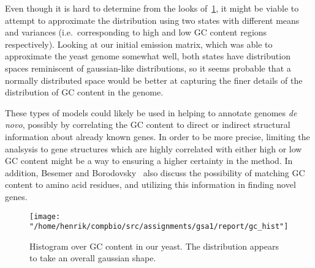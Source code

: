 \documentclass[10pt]{article}\usepackage[]{graphicx}\usepackage[]{color}
\theoremstyle{plain}
\begin{document}
Even though it is hard to determine from the looks of~\cref{fig:gc_hist}, it might be viable to attempt to approximate the distribution using two states with different means and variances (i.e.\ corresponding to high and low GC content regions respectively). Looking at our initial emission matrix, which was able to approximate the yeast genome somewhat well, both states have distribution spaces reminiscent of gaussian-like distributions, so it seems probable that a normally distributed space would be better at capturing the finer details of the distribution of GC content in the genome. 

These types of models could likely be used in helping to annotate genomes \textit{de novo}, possibly by correlating the GC content to direct or indirect structural information about already known genes. In order to be more precise, limiting the analsysis to gene structures which are highly correlated with either high or low GC content might be a way to ensuring a higher certainty in the method. In addition, Besemer and Borodovsky~\cite{heuristic} also discuss the possibility of matching GC content to amino acid residues, and utilizing this information in finding novel genes. 

\begin{figure}[H]
  \centering
  \texttt{[image: "/home/henrik/compbio/src/assignments/gsa1/report/gc\_hist"]}
  \caption{Histogram over GC content in our yeast. The distribution appears to take an overall gaussian shape.}
  \label{fig:gc_hist}
\end{figure}
\end{document}
